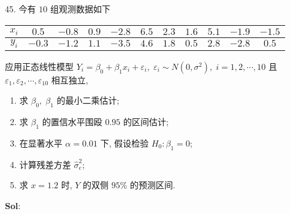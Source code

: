 

45. 今有 $10$ 组观测数据如下

\begin{center}
    \begin{tabular}{c|cccccccccc}
        \hline
        $x_i$ & $0.5$ & $-0.8$ & $0.9$ & $-2.8$ & $6.5$ & $2.3$ & $1.6$ & $5.1$ & $-1.9$ & $-1.5$\\
        \hline
        $y_i$ & $-0.3$ & $-1.2$ & $1.1$ & $-3.5$ & $4.6$ & $1.8$ & $0.5$ & $2.8$ & $-2.8$ & $0.5$\\
        \hline
    \end{tabular}
\end{center}

应用正态线性模型 $Y_i=\beta_0+\beta_1x_i+\varepsilon_i,\;\varepsilon_i\sim N(0,\sigma^2),\;i=1,2,\cdots,10$ 且 $\varepsilon_1,\varepsilon_2,\cdots,\varepsilon_{10}$ 相互独立, 
\begin{enumerate}[(1)]
    \item 求 $\beta_0,\;\beta_1$ 的最小二乘估计;
    \item 求 $\beta_1$ 的置信水平围殴 $0.95$ 的区间估计;
    \item 在显著水平 $\alpha=0.01$ 下, 假设检验 $H_0:\beta_1=0$;
    \item 计算残差方差 $\hat{\sigma}^2_e$;
    \item 求 $x=1.2$ 时, $Y$ 的双侧 $95\%$ 的预测区间.
\end{enumerate}

\textbf{Sol}:  

